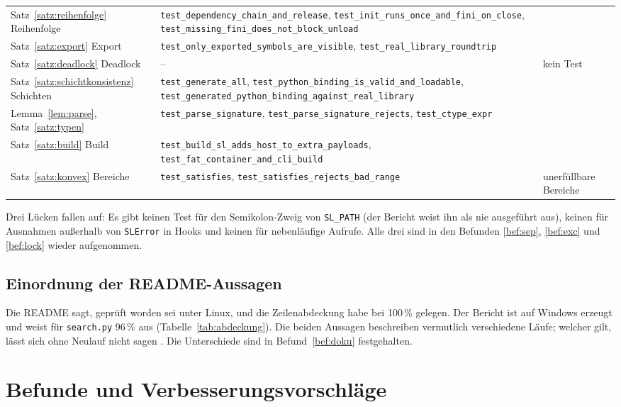{\begin{longtable}{@{}L{4.3cm}L{6.5cm}L{3.4cm}@{}}
Satz~\ref{satz:reihenfolge} Reihenfolge & \texttt{test\_dependency\_chain\_and\_release}, \texttt{test\_init\_runs\_once\_and\_fini\_on\_close}, \texttt{test\_missing\_fini\_does\_not\_block\_unload} & \\[0.3em]
Satz~\ref{satz:export} Export & \texttt{test\_only\_exported\_symbols\_are\_visible}, \texttt{test\_real\_library\_roundtrip} & \\[0.3em]
Satz~\ref{satz:deadlock} Deadlock & -- & kein Test \\[0.3em]
Satz~\ref{satz:schichtkonsistenz} Schichten & \texttt{test\_generate\_all}, \texttt{test\_python\_binding\_is\_valid\_and\_loadable}, \texttt{test\_generated\_python\_binding\_against\_real\_library} & \\[0.3em]
Lemma~\ref{lem:parse}, Satz~\ref{satz:typen} & \texttt{test\_parse\_signature}, \texttt{test\_parse\_signature\_rejects}, \texttt{test\_ctype\_expr} & \\[0.3em]
Satz~\ref{satz:build} Build & \texttt{test\_build\_sl\_adds\_host\_to\_extra\_payloads}, \texttt{test\_fat\_container\_and\_cli\_build} & \\[0.3em]
Satz~\ref{satz:konvex} Bereiche & \texttt{test\_satisfies}, \texttt{test\_satisfies\_rejects\_bad\_range} & unerfüllbare Bereiche \\
\end{longtable}
}

Drei Lücken fallen auf: Es gibt keinen Test für den Semikolon-Zweig von \texttt{SL\_PATH} (der Bericht weist ihn als nie ausgeführt aus), keinen für Ausnahmen außerhalb von \texttt{SLError} in Hooks und keinen für nebenläufige Aufrufe. Alle drei sind in den Befunden \ref{bef:sep}, \ref{bef:exc} und \ref{bef:lock} wieder aufgenommen.

\section{Einordnung der README-Aussagen}

Die README sagt, geprüft worden sei unter Linux, und die Zeilenabdeckung habe bei 100\,\% gelegen. Der Bericht ist auf Windows erzeugt und weist für \texttt{search.py} 96\,\% aus (Tabelle~\ref{tab:abdeckung}). Die beiden Aussagen beschreiben vermutlich verschiedene Läufe; welcher gilt, lässt sich ohne Neulauf nicht sagen . Die Unterschiede sind in Befund~\ref{bef:doku} festgehalten.

\chapter{Befunde und Verbesserungsvorschläge}
\label{chap:befunde}

